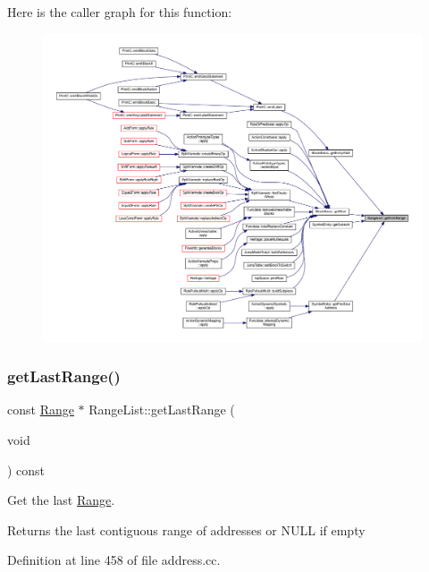 Here is the caller graph for this function\+:
\nopagebreak
\begin{figure}[H]
\begin{center}
\leavevmode
\includegraphics[width=350pt]{class_range_list_aab11ea47a228e2689d18061df238dc6f_icgraph}
\end{center}
\end{figure}
\mbox{\label{class_range_list_a335abcacfeb584ef9684d60adfce11b9}} 
\subsubsection{\texorpdfstring{getLastRange()}{getLastRange()}}
{\footnotesize\ttfamily const \mbox{\hyperlink{class_range}{Range}} $\ast$ Range\+List\+::get\+Last\+Range (\begin{DoxyParamCaption}\item[{void}]{ }\end{DoxyParamCaption}) const}



Get the last \mbox{\hyperlink{class_range}{Range}}. 

\begin{DoxyReturn}{Returns}
the last contiguous range of addresses or N\+U\+LL if empty 
\end{DoxyReturn}


Definition at line 458 of file address.\+cc.

